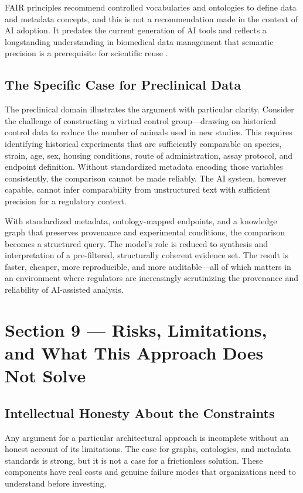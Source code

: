 \documentclass[man,12pt,donotrepeattitle]{apa7}
\begin{document}
FAIR principles recommend controlled vocabularies and ontologies to define
data and metadata concepts, and this is not a recommendation made in the
context of AI adoption. It predates the current generation of AI tools and
reflects a longstanding understanding in biomedical data management that
semantic precision is a prerequisite for scientific reuse
\parencite{bernabe2023}.

\subsection{The Specific Case for Preclinical Data}

The preclinical domain illustrates the argument with particular clarity.
Consider the challenge of constructing a virtual control group---drawing on
historical control data to reduce the number of animals used in new studies.
This requires identifying historical experiments that are sufficiently
comparable on species, strain, age, sex, housing conditions, route of
administration, assay protocol, and endpoint definition. Without standardized
metadata encoding those variables consistently, the comparison cannot be made
reliably. The AI system, however capable, cannot infer comparability from
unstructured text with sufficient precision for a regulatory context.

With standardized metadata, ontology-mapped endpoints, and a knowledge graph
that preserves provenance and experimental conditions, the comparison becomes
a structured query. The model's role is reduced to synthesis and
interpretation of a pre-filtered, structurally coherent evidence set. The
result is faster, cheaper, more reproducible, and more auditable---all of
which matters in an environment where regulators are increasingly
scrutinizing the provenance and reliability of AI-assisted analysis.


\section{Section 9 --- Risks, Limitations, and What This Approach Does Not Solve}

\subsection{Intellectual Honesty About the Constraints}

Any argument for a particular architectural approach is incomplete without
an honest account of its limitations. The case for graphs, ontologies, and
metadata standards is strong, but it is not a case for a frictionless
solution. These components have real costs and genuine failure modes that
organizations need to understand before investing.
\end{document}
